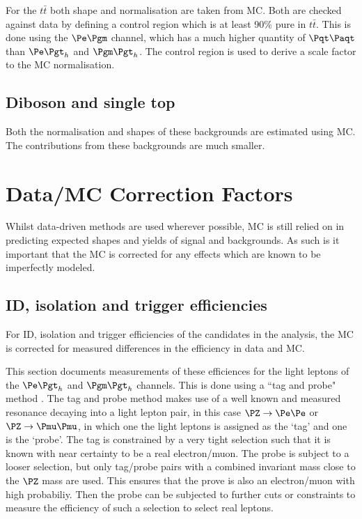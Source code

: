 For the $t \bar{t}$ both shape and normalisation are taken from MC. Both are checked
against data by defining a control region which is at least 90$\%$ pure in
$t \bar{t}$. This is done using the $\emu$ channel, which has a much higher
quantity of $\ttbar$ than $\etau$ and $\mutau$. The control region is used to
derive a scale factor to the \ac{MC} normalisation. 

\subsection{Diboson and single top}
Both the normalisation and shapes of these backgrounds are estimated using MC.
The contributions from these backgrounds are much smaller.

\section{Data/MC Correction Factors}
\label{sec:datamcfactors}

Whilst data-driven methods are used wherever possible, MC is still
relied on in predicting expected shapes and yields of signal and backgrounds.
As such is it important that the MC is corrected for
any effects which are known to be imperfectly modeled. 

\subsection{ID, isolation and trigger efficiencies}

For ID, isolation and
trigger efficiencies of the candidates in the analysis, the \ac{MC} is corrected
for measured differences in the efficiency in data and \ac{MC}.

This section documents measurements of these efficiences for the light leptons
of the $\etau$ and $\mutau$ channels. This is done using a ``tag and probe"
method \cite{Khachatryan:2010xn}.
The tag and probe method makes use of a well known and measured resonance decaying
into a light lepton pair, in this case $\PZ\to\Pe\Pe$ or $\PZ\to\Pmu\Pmu$, 
in which one the light leptons is assigned as the `tag' and one is the `probe'. 
The tag is constrained by a very tight selection such that it is known with near 
certainty to be a real electron/muon. The probe is subject to a looser selection, 
but only tag/probe pairs with a
combined invariant mass close to the $\PZ$ mass are used. This ensures that the
prove is also an electron/muon with high probabiliy. Then the probe can be 
subjected to further cuts or constraints to measure the efficiency of such a 
selection to select real leptons.

